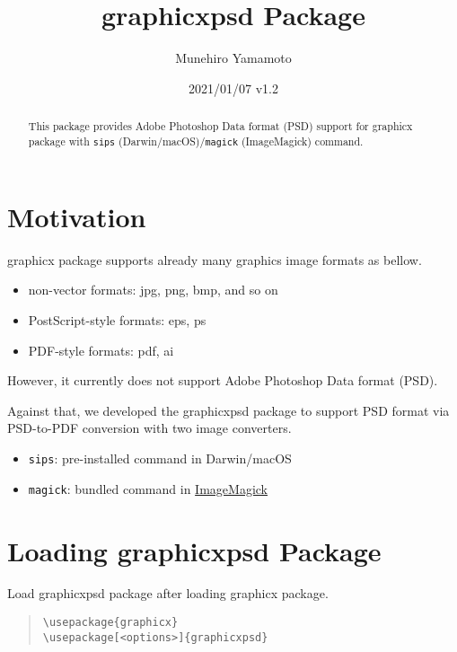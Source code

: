 \documentclass[luatex]{article}
\title{\textsf{graphicxpsd} Package}
\author{Munehiro Yamamoto}
\date{2021/01/07 v1.2}
\begin{document}
\maketitle
\begin{abstract}
This package provides Adobe Photoshop Data format (PSD) support
for \textsf{graphicx} package
with \texttt{sips} (Darwin/macOS)/\texttt{magick} (ImageMagick) command.
\end{abstract}

\section{Motivation}
\textsf{graphicx} package supports already many graphics image formats as bellow.
\begin{itemize}
\item non-vector formats: jpg, png, bmp, and so on
\item PostScript-style formats: eps, ps
\item PDF-style formats: pdf, ai
\end{itemize}
However, it currently does not support Adobe Photoshop Data format (PSD).

Against that, we developed the \textsf{graphicxpsd} package
to support PSD format via PSD-to-PDF conversion
with two image converters.
\begin{itemize}
\item \texttt{sips}:
pre-installed command in Darwin/macOS

\item \texttt{magick}:
bundled command in \href{https://www.imagemagick.org/}{ImageMagick}
\end{itemize}

\section{Loading \textsf{graphicxpsd} Package}

Load \textsf{graphicxpsd} package after loading \textsf{graphicx} package.

\begin{quote}
\begin{verbatim}
\usepackage{graphicx}
\usepackage[<options>]{graphicxpsd}
\end{verbatim}
\end{quote}
\end{document}
